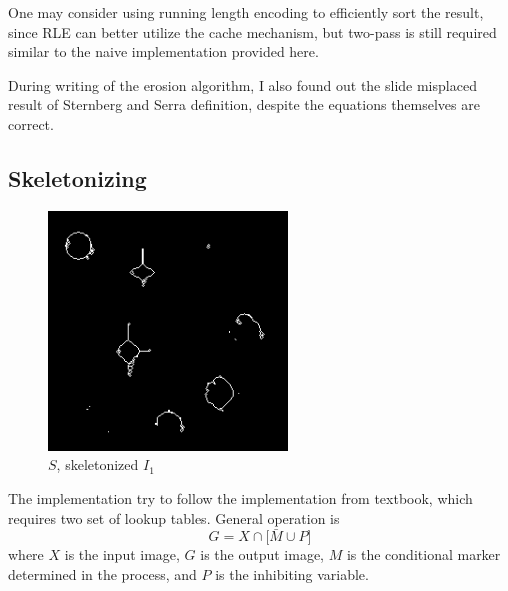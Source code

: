 \documentclass[12pt]{article}
\begin{document}
One may consider using running length encoding to efficiently sort the result, since RLE can better utilize the cache mechanism, but two-pass is still required similar to the naive implementation provided here.

During writing of the erosion algorithm, I also found out the slide misplaced result of Sternberg and Serra definition, despite the equations themselves are correct.

\subsection*{Skeletonizing}
\begin{figure}[H]
    \centering
    \includegraphics[height=2.5in]{images/S}
    \caption{$S$, skeletonized $I_1$}
\end{figure}
The implementation try to follow the implementation from textbook, which requires two set of lookup tables. General operation is 
\begin{equation}
	G = X \cap \lbrack \bar{M} \cup P \rbrack
\end{equation}
where $X$ is the input image, $G$ is the output image, $M$ is the conditional marker determined in the process, and $P$ is the inhibiting variable.
\end{document}
